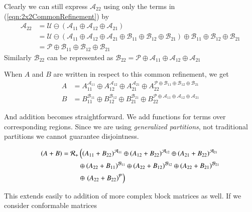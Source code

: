 Clearly we can still express $\mathcal{A}_{22}$ using only the terms in (\ref{eqn:2x2CommonRefinement}) by
\begin{align*}
	\mathcal{A}_{22} &= \mathcal{U} \ominus (\mathcal{A}_{11} \oplus \mathcal{A}_{12} \oplus \mathcal{A}_{21})\\
		& = \mathcal{U} \ominus (\mathcal{A}_{11} \oplus \mathcal{A}_{12} \oplus \mathcal{A}_{21} \oplus \mathcal{B}_{11} \oplus \mathcal{B}_{12} \oplus \mathcal{B}_{21}) \oplus \mathcal{B}_{11} \oplus \mathcal{B}_{12} \oplus \mathcal{B}_{21}\\
		&= \mathcal{P} \oplus \mathcal{B}_{11} \oplus \mathcal{B}_{12} \oplus \mathcal{B}_{21}
\end{align*}
Similarly $\mathcal{B}_{22}$ can be represented as $\mathcal{B}_{22} = \mathcal{P} \oplus \mathcal{A}_{11} \oplus \mathcal{A}_{12} \oplus \mathcal{A}_{21}$

When $A$ and $B$ are written in respect to this common refinement, we get
\begin{align*}
	A &= A_{11}^{\mathcal{A}_{11}} \oplus 
		A_{12}^{\mathcal{A}_{12}} \oplus 
		A_{21}^{\mathcal{A}_{21}} \oplus 
		A_{22}^{\mathcal{P} \oplus \mathcal{B}_{11} \oplus \mathcal{B}_{12} \oplus \mathcal{B}_{21}} \\
	B &= B_{11}^{\mathcal{B}_{11}} \oplus 
		B_{12}^{\mathcal{B}_{12}} \oplus 
		B_{21}^{\mathcal{B}_{21}} \oplus 
		B_{22}^{\mathcal{P} \oplus \mathcal{A}_{11} \oplus \mathcal{A}_{12} \oplus \mathcal{A}_{21}} 
\end{align*}

And addition becomes straightforward. 
We add functions for terms over corresponding regions.
Since we are using \emph{generalized partitions}, not traditional partitions we cannot guarantee disjointness.

\begin{align*}
	(A+B) = \R[+] & \left(  (A_{11}+B_{22})^{\mathcal{A}_{11}} \oplus 
		(A_{12} + B_{22})^{\mathcal{A}_{12}} \oplus 
		(A_{21} + B_{22})^{\mathcal{A}_{21}} \right. \\ &\oplus 
		(A_{22} + B_{11})^{\mathcal{B}_{11}} \oplus 
		(A_{22} + B_{12})^{\mathcal{B}_{12}} \oplus 
		(A_{22} + B_{21})^{\mathcal{B}_{21}} \\ &\oplus
		\left.(A_{22} + B_{22})^{\mathcal{P}} \right)
\end{align*}




This extends easily to addition of more complex block matrices as well.
If we consider conformable matrices

